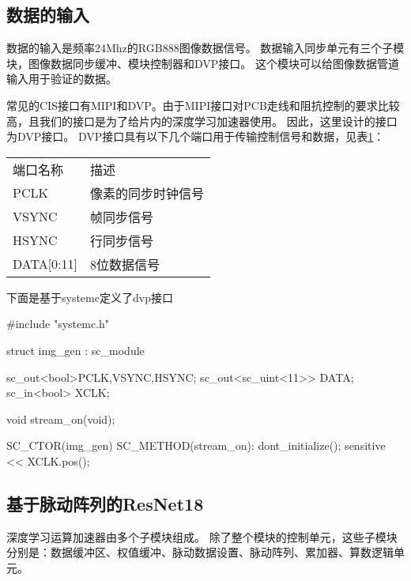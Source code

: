 \subsection{数据的输入}
数据的输入是频率24Mhz的RGB888图像数据信号。
数据输入同步单元有三个子模块，图像数据同步缓冲、模块控制器和DVP接口。
这个模块可以给图像数据管道输入用于验证的数据。

常见的CIS接口有MIPI和DVP。由于MIPI接口对PCB走线和阻抗控制的要求比较高，且我们的接口是为了给片内的深度学习加速器使用。
因此，这里设计的接口为DVP接口。
DVP接口具有以下几个端口用于传输控制信号和数据，见表\ref{tab:port_of_dvp}：
\begin{table}[!hpt]
  \label{tab:port_of_dvp}
  \centering
  \begin{tabular}{@{}ll@{}} \toprule
    端口名称  & 描述  \\
    PCLK    & 像素的同步时钟信号  \\
    VSYNC   & 帧同步信号         \\
    HSYNC   & 行同步信号         \\
    DATA[0:11]&8位数据信号        \\

  \end{tabular}
\end{table}

下面是基于systemc定义了dvp接口

\begin{codeblock}[language=c++]
#include "systemc.h"

struct img_gen : sc_module{
  sc_out<bool>PCLK,VSYNC,HSYNC;
  sc_out<sc_uint<11>> DATA;
  sc_in<bool> XCLK;

  void stream_on(void);
  
  SC_CTOR(img_gen){
  SC_METHOD(stream_on):
    dont_initialize();
    sensitive << XCLK.pos();
  }
}

\end{codeblock}







\subsection{基于脉动阵列的ResNet18}  
深度学习运算加速器由多个子模块组成。
除了整个模块的控制单元，这些子模块分别是：数据缓冲区、权值缓冲、脉动数据设置、脉动阵列、累加器、算数逻辑单元。


